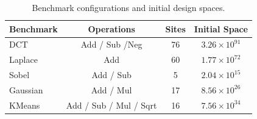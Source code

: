 \begin{table}[t]
\centering

\caption{Benchmark configurations and initial design spaces.}
\label{tab:benchmarks}
\footnotesize
\setlength{\tabcolsep}{3pt}
\renewcommand{\arraystretch}{1.10}
\begin{tabular*}{\columnwidth}
{@{\extracolsep{\fill}}lccc@{}}
\toprule
Benchmark & Operations & Sites & Initial Space \\
\midrule
DCT & Add / Sub /Neg & 76 & $3.26\times10^{91}$ \\
Laplace & Add & 60 & $1.77\times10^{72}$ \\
Sobel & Add / Sub & 5 & $2.04\times10^{15}$ \\
Gaussian & Add / Mul & 17 & $8.56\times10^{26}$ \\
KMeans & Add / Sub / Mul / Sqrt & 16 & $7.56\times10^{34}$ \\
\bottomrule
\end{tabular*}

\end{table}



